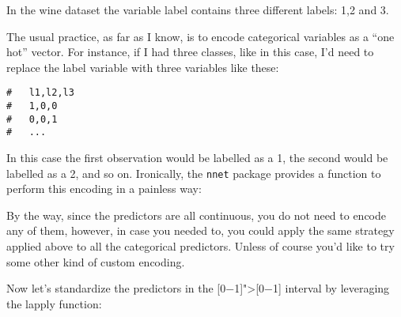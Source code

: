 \documentclass[]{book}
\newenvironment{Shaded}{\begin{snugshade}}{\end{snugshade}}
\newcommand{\CommentTok}[1]{\textcolor[rgb]{0.56,0.35,0.01}{\textit{#1}}}
\newcommand{\DecValTok}[1]{\textcolor[rgb]{0.00,0.00,0.81}{#1}}
\newcommand{\KeywordTok}[1]{\textcolor[rgb]{0.13,0.29,0.53}{\textbf{#1}}}
\newcommand{\NormalTok}[1]{#1}
\newcommand{\OperatorTok}[1]{\textcolor[rgb]{0.81,0.36,0.00}{\textbf{#1}}}
\newcommand{\StringTok}[1]{\textcolor[rgb]{0.31,0.60,0.02}{#1}}
\begin{document}
In the wine dataset the variable label contains three different labels: 1,2 and 3.

The usual practice, as far as I know, is to encode categorical variables as a ``one hot'' vector. For instance, if I had three classes, like in this case, I'd need to replace the label variable with three variables like these:

\begin{verbatim}
#   l1,l2,l3
#   1,0,0
#   0,0,1
#   ...
\end{verbatim}

In this case the first observation would be labelled as a 1, the second would be labelled as a 2, and so on. Ironically, the \texttt{nnet} package provides a function to perform this encoding in a painless way:

\begin{Shaded}
\end{Shaded}

By the way, since the predictors are all continuous, you do not need to encode any of them, however, in case you needed to, you could apply the same strategy applied above to all the categorical predictors. Unless of course you'd like to try some other kind of custom encoding.

Now let's standardize the predictors in the {[}0−1{]}"\textgreater{}{[}0−1{]} interval by leveraging the lapply function:
\end{document}
